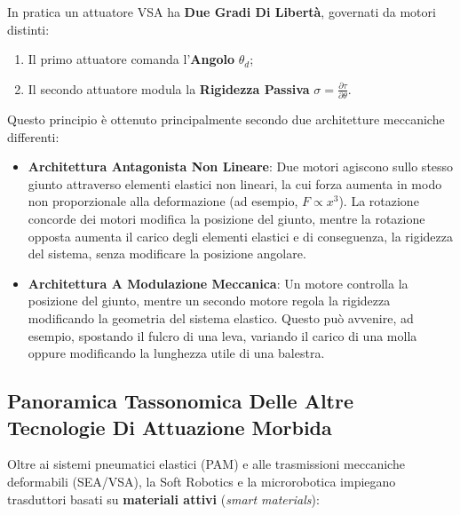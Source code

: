 ﻿\documentclass[11pt, a4paper]{article}
\begin{document}
In pratica un attuatore VSA ha \textbf{Due Gradi Di Libertà}, governati da motori distinti:
\begin{enumerate}
    \item Il primo attuatore comanda l'\textbf{Angolo} $\theta_d$;
    \item Il secondo attuatore modula la \textbf{Rigidezza Passiva} $\sigma = \frac{\partial \tau}{\partial \theta}$.
\end{enumerate}
Questo principio è ottenuto principalmente secondo due architetture meccaniche differenti:
\begin{itemize}
    \item \textbf{Architettura Antagonista Non Lineare}: Due motori agiscono sullo stesso giunto attraverso elementi elastici non lineari, la cui forza aumenta in modo non proporzionale alla deformazione (ad esempio, $F \propto x^3$). La rotazione concorde dei motori modifica la posizione del giunto, mentre la rotazione opposta aumenta il carico degli elementi elastici e di conseguenza, la rigidezza del sistema, senza modificare la posizione angolare.

    \item \textbf{Architettura A Modulazione Meccanica}: Un motore controlla la posizione del giunto, mentre un secondo motore regola la rigidezza modificando la geometria del sistema elastico. Questo può avvenire, ad esempio, spostando il fulcro di una leva, variando il carico di una molla oppure modificando la lunghezza utile di una balestra.
\end{itemize}
\newpage
\subsection{Panoramica Tassonomica Delle Altre Tecnologie Di Attuazione Morbida}

Oltre ai sistemi pneumatici elastici (PAM) e alle trasmissioni meccaniche deformabili (SEA/VSA), la Soft Robotics e la microrobotica impiegano trasduttori basati su \textbf{materiali attivi} (\textit{smart materials}):
\end{document}
